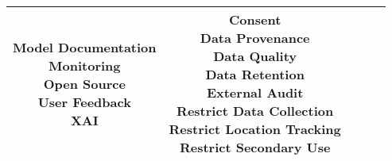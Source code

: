 \documentclass[fleqn]{article}
\begin{document}
\begin{landscape}
\begin{table}[H]
\begin{tabular}{|c|c|c|c|c|}
{			\textbullet\hspace{3pt} Model Documentation \\ 	
			\textbullet\hspace{3pt} Monitoring\\ 
			\textbullet\hspace{3pt} Open Source\\ 	
			\textbullet\hspace{3pt} User Feedback\\ 
			\textbullet\hspace{3pt} XAI \\
		}
		& \makecell[l]{
			\textbullet\hspace{3pt} Consent\\ 	
			\textbullet\hspace{3pt} Data Provenance\\ 	
			\textbullet\hspace{3pt} Data Quality\\ 	
			\textbullet\hspace{3pt} Data Retention\\ 	
			\textbullet\hspace{3pt} External Audit\\ 	
			\textbullet\hspace{3pt} Restrict Data Collection\\ 				
			\textbullet\hspace{3pt} Restrict Location Tracking\\ 		 
			\textbullet\hspace{3pt} Restrict Secondary Use\\ 			 
		}
		\\
		\hline
	\end{tabular}
	\label{table:med_risk_plan_by_tc}
\end{table}

\vfill
\raisebox{-10pt}{\makebox[\linewidth]{\thepage}}

\pagebreak
\thispagestyle{empty}


\end{landscape}
\end{document}
